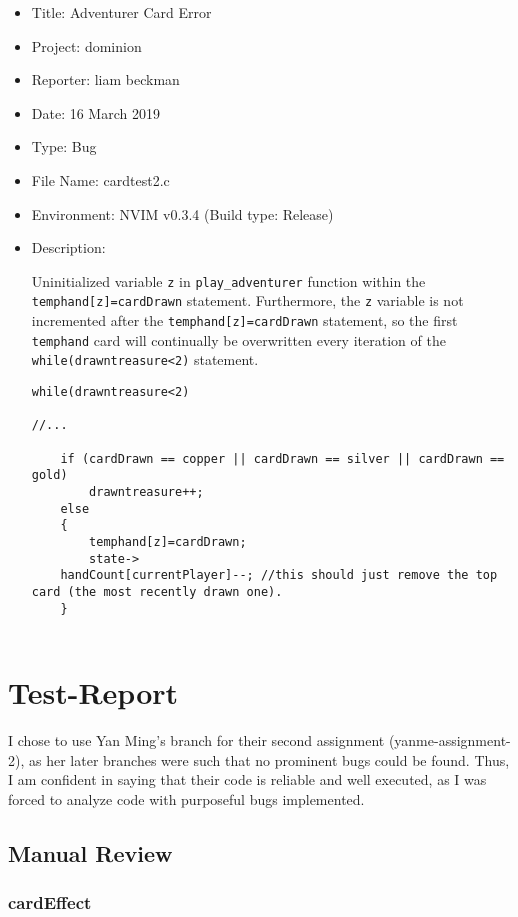 \documentclass[11pt]{article}
\begin{document}
\begin{itemize}
\item Title: Adventurer Card Error
\item Project: dominion
\item Reporter: liam beckman
\item Date: 16 March 2019
\item Type: Bug
\item File Name: cardtest2.c
\item Environment: NVIM v0.3.4 (Build type: Release)
\item Description:

Uninitialized variable \texttt{z} in \texttt{play\_adventurer} function within the \texttt{temphand[z]=cardDrawn} statement. Furthermore, the \texttt{z} variable is not incremented after the \texttt{temphand[z]=cardDrawn} statement, so the first \texttt{temphand} card will continually be overwritten every iteration of the \texttt{while(drawntreasure<2)} statement.

\begin{verbatim}
while(drawntreasure<2)

//...

    if (cardDrawn == copper || cardDrawn == silver || cardDrawn == gold)
        drawntreasure++;
    else
    {
        temphand[z]=cardDrawn;
        state->
    handCount[currentPlayer]--; //this should just remove the top card (the most recently drawn one).
    }


\end{verbatim}
\end{itemize}

\section{Test-Report}
\label{sec:testreport}

I chose to use Yan Ming's branch for their second assignment (yanme-assignment-2), as her later branches were such that no prominent bugs could be found. Thus, I am confident in saying that their code is reliable and well executed, as I was forced to analyze code with purposeful bugs implemented.

\subsection{Manual Review}
\label{sec:manualreview}
\subsubsection{cardEffect}
\label{sec:cardeffect}
\end{document}
